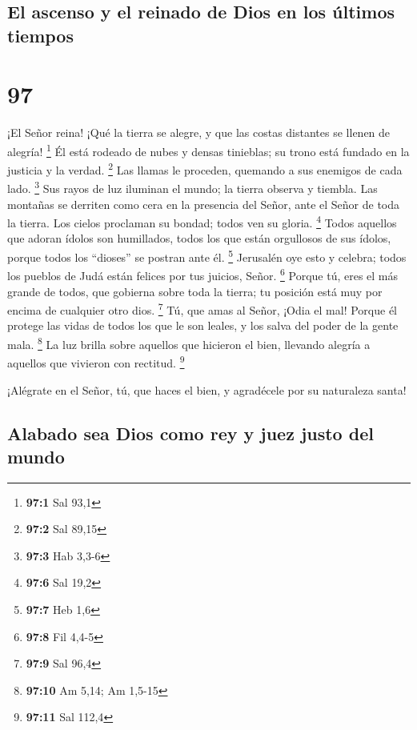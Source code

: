 \hypertarget{el-ascenso-y-el-reinado-de-dios-en-los-uxfaltimos-tiempos}{%
\subsection{El ascenso y el reinado de Dios en los últimos
tiempos}\label{el-ascenso-y-el-reinado-de-dios-en-los-uxfaltimos-tiempos}}

\hypertarget{section-96}{%
\section{97}\label{section-96}}

 ¡El Señor reina! ¡Qué la tierra se alegre, y que las costas
distantes se llenen de alegría! \footnote{\textbf{97:1} Sal 93,1}
 Él está rodeado de nubes y densas tinieblas; su trono está
fundado en la justicia y la verdad. \footnote{\textbf{97:2} Sal 89,15}
 Las llamas le proceden, quemando a sus enemigos de cada
lado. \footnote{\textbf{97:3} Hab 3,3-6}  Sus rayos de luz
iluminan el mundo; la tierra observa y tiembla.  Las
montañas se derriten como cera en la presencia del Señor, ante el Señor
de toda la tierra.  Los cielos proclaman su bondad; todos
ven su gloria. \footnote{\textbf{97:6} Sal 19,2}  Todos
aquellos que adoran ídolos son humillados, todos los que están
orgullosos de sus ídolos, porque todos los ``dioses'' se postran ante
él. \footnote{\textbf{97:7} Heb 1,6}  Jerusalén oye esto y
celebra; todos los pueblos de Judá están felices por tus juicios, Señor.
\footnote{\textbf{97:8} Fil 4,4-5}  Porque tú, eres el más
grande de todos, que gobierna sobre toda la tierra; tu posición está muy
por encima de cualquier otro dios. \footnote{\textbf{97:9} Sal 96,4}
 Tú, que amas al Señor, ¡Odia el mal! Porque él protege las
vidas de todos los que le son leales, y los salva del poder de la gente
mala. \footnote{\textbf{97:10} Am 5,14; Am 1,5-15}  La luz
brilla sobre aquellos que hicieron el bien, llevando alegría a aquellos
que vivieron con rectitud. \footnote{\textbf{97:11} Sal 112,4}

 ¡Alégrate en el Señor, tú, que haces el bien, y agradécele
por su naturaleza santa!

\hypertarget{alabado-sea-dios-como-rey-y-juez-justo-del-mundo}{%
\subsection{Alabado sea Dios como rey y juez justo del
mundo}\label{alabado-sea-dios-como-rey-y-juez-justo-del-mundo}}

